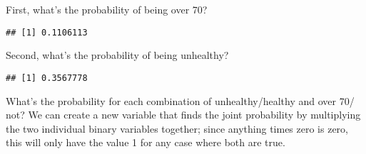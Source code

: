 \documentclass[12pt,]{book}
\newenvironment{Shaded}{\begin{snugshade}}{\end{snugshade}}
\newcommand{\CommentTok}[1]{\textcolor[rgb]{0.56,0.35,0.01}{\textit{#1}}}
\newcommand{\DataTypeTok}[1]{\textcolor[rgb]{0.13,0.29,0.53}{#1}}
\newcommand{\KeywordTok}[1]{\textcolor[rgb]{0.13,0.29,0.53}{\textbf{#1}}}
\newcommand{\NormalTok}[1]{#1}
\newcommand{\OperatorTok}[1]{\textcolor[rgb]{0.81,0.36,0.00}{\textbf{#1}}}
\newcommand{\StringTok}[1]{\textcolor[rgb]{0.31,0.60,0.02}{#1}}
\begin{document}
First, what's the probability of being over 70?

\begin{Shaded}
\end{Shaded}

\begin{verbatim}
## [1] 0.1106113
\end{verbatim}

Second, what's the probability of being unhealthy?

\begin{Shaded}
\end{Shaded}

\begin{verbatim}
## [1] 0.3567778
\end{verbatim}

What's the probability for each combination of unhealthy/healthy and over 70/ not? We can create a new variable that finds the joint probability by multiplying the two individual binary variables together; since anything times zero is zero, this will only have the value 1 for any case where both are true.

\begin{Shaded}
\end{Shaded}
\end{document}
